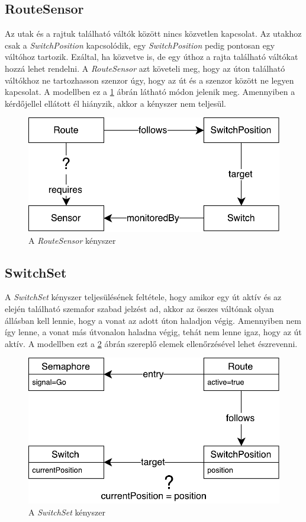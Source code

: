 \subsection{RouteSensor}

Az utak és a rajtuk található váltók között nincs közvetlen kapcsolat. Az utakhoz csak a \emph{SwitchPosition} kapcsolódik, egy \emph{SwitchPosition} pedig pontosan egy váltóhoz tartozik. Ezáltal, ha közvetve is, de egy úthoz a rajta található váltókat hozzá lehet rendelni. A \emph{RouteSensor} azt követeli meg, hogy az úton található váltókhoz ne tartozhasson szenzor úgy, hogy az út és a szenzor között ne legyen kapcsolat. A modellben ez a \ref{fig:RouteSensor} ábrán látható módon jelenik meg. Amennyiben a kérdőjellel ellátott él hiányzik, akkor a kényszer nem teljesül.

\begin{figure}[!ht]
	\centering
	\includegraphics[width=0.7\linewidth, keepaspectratio]{figures/RouteSensor.pdf}
	\caption{A \emph{RouteSensor} kényszer}
	\label{fig:RouteSensor}
\end{figure}

\subsection{SwitchSet}

A \emph{SwitchSet} kényszer teljesülésének feltétele, hogy amikor egy út aktív és az elején található szemafor szabad jelzést ad, akkor az összes váltónak olyan állásban kell lennie, hogy a vonat az adott úton haladjon végig. Amennyiben nem így lenne, a vonat más útvonalon haladna végig, tehát nem lenne igaz, hogy az út aktív. A modellben ezt a \ref{fig:SwitchSet} ábrán szereplő elemek ellenőrzésével lehet észrevenni.

\begin{figure}[!ht]
	\centering
	\includegraphics[width=0.7\linewidth, keepaspectratio]{figures/SwitchSet.pdf}
	\caption{A \emph{SwitchSet} kényszer}
	\label{fig:SwitchSet}
\end{figure}

